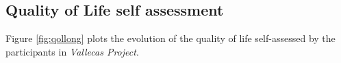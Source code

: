 \documentclass[11pt]{article}
\theoremstyle{definition}
\theoremstyle{remark}
\begin{document}

\subsection{Quality of Life self assessment}
\label{sse:qol}

Figure \ref{fig:qollong} plots the evolution of the quality of life self-assessed by the participants in \emph{Vallecas Project}.
\end{document}

